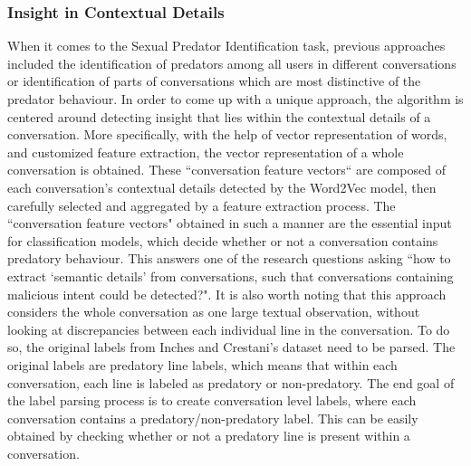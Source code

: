 \documentclass[11pt]{article}
\begin{document}
\subsubsection{Insight in Contextual Details}
When it comes to the Sexual Predator Identification task, previous approaches included the identification of predators among all users in different conversations or identification of parts of conversations which are most distinctive of the predator behaviour. In order to come up with a unique approach, the algorithm is centered around detecting insight that lies within the contextual details of a conversation. More specifically, with the help of vector representation of words, and customized feature extraction, the vector representation of a whole conversation is obtained. These ``conversation feature vectors`` are composed of each conversation's contextual details detected by the Word2Vec model, then carefully selected and aggregated by a feature extraction process. The ``conversation feature vectors" obtained in such a manner are the essential input for classification models, which decide whether or not a conversation contains predatory behaviour. This answers one of the research questions asking ``how to extract ‘semantic details’ from conversations, such that conversations containing malicious intent could be detected?". It is also worth noting that this approach considers the whole conversation as one large textual observation, without looking at discrepancies between each individual line in the conversation. To do so, the original labels from Inches and Crestani's dataset need to be parsed. The original labels are predatory line labels, which means that within each conversation, each line is labeled as predatory or non-predatory. The end goal of the label parsing process is to create conversation level labels, where each conversation contains a predatory/non-predatory label. This can be easily obtained by checking whether or not a predatory line is present within a conversation.

\end{document}
